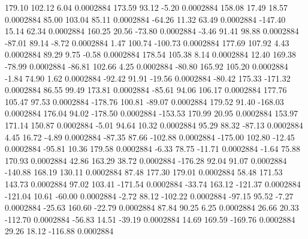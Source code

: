       179.10      102.12        6.04     0.0002884
      173.59       93.12       -5.20     0.0002884
      158.08       17.49       18.57     0.0002884
       85.00      103.04       85.11     0.0002884
      -64.26       11.32       63.49     0.0002884
     -147.40       15.14       62.34     0.0002884
      160.25       20.56      -73.80     0.0002884
       -3.46       91.41       98.88     0.0002884
      -87.01       89.14       -8.72     0.0002884
        1.47      100.74     -100.73     0.0002884
      177.69      107.92        4.43     0.0002884
       89.29        9.75       -0.58     0.0002884
      178.54      105.38        8.14     0.0002884
       12.40      169.38      -78.99     0.0002884
      -86.81      102.66        4.25     0.0002884
      -80.80      165.92      105.20     0.0002884
       -1.84       74.90        1.62     0.0002884
      -92.42       91.91      -19.56     0.0002884
      -80.42      175.33     -171.32     0.0002884
       86.55       99.49      173.81     0.0002884
      -85.61       94.06      106.17     0.0002884
      177.76      105.47       97.53     0.0002884
     -178.76      100.81      -89.07     0.0002884
      179.52       91.40     -168.03     0.0002884
      176.04       94.02     -178.50     0.0002884
     -153.53      170.99       20.95     0.0002884
      153.97      171.14      150.87     0.0002884
       -5.01       94.64       10.32     0.0002884
       95.29       88.32      -87.13     0.0002884
        4.45       16.72       -4.89     0.0002884
      -87.35       87.66     -102.88     0.0002884
     -175.00      102.80      -12.45     0.0002884
      -95.81       10.36      179.58     0.0002884
       -6.33       78.75      -11.71     0.0002884
       -1.64       75.88      170.93     0.0002884
       42.86      163.29       38.72     0.0002884
     -176.28       92.04       91.07     0.0002884
     -140.88      168.19      130.11     0.0002884
       87.48      177.30      179.01     0.0002884
       58.48      171.53      143.73     0.0002884
       97.02      103.41     -171.54     0.0002884
      -33.74      163.12     -121.37     0.0002884
     -121.04       10.61      -60.00     0.0002884
       -2.72       88.12     -102.22     0.0002884
      -97.15       95.52       -7.27     0.0002884
      -25.63      160.60      -22.79     0.0002884
       87.84       90.25        6.25     0.0002884
       26.66       20.33     -112.70     0.0002884
      -56.83       14.51      -39.19     0.0002884
       14.69      169.59     -169.76     0.0002884
       29.26       18.12     -116.88     0.0002884
